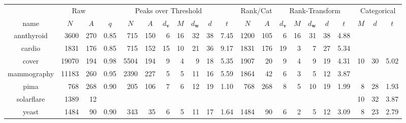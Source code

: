 \begin{tabular}{c|rr|rrrrrrrr|rr|rrrrr|rrr}
  \toprule



   
\multicolumn{1}{c}{~} & \multicolumn{2}{c}{Raw} & \multicolumn{8}{c}{Peaks over Threshold} & \multicolumn{2}{c}{Rank/Cat} & \multicolumn{5}{c}{Rank-Transform} & \multicolumn{3}{c}{Categorical} \\
\multicolumn{1}{c}{name} & \multicolumn{1}{c}{$N$} & \multicolumn{1}{c}{$A$} & \multicolumn{1}{c}{$q$} & \multicolumn{1}{c}{$N$} & \multicolumn{1}{c}{$A$} & \multicolumn{1}{c}{$d_{\bm{v}}$} & \multicolumn{1}{c}{$M$} & \multicolumn{1}{c}{$d_{\bm{w}}$} & \multicolumn{1}{c}{$d$} & \multicolumn{1}{c}{$t$} & \multicolumn{1}{c}{$N$} & \multicolumn{1}{c}{$A$} & \multicolumn{1}{c}{$d_{\bm{v}}$} & \multicolumn{1}{c}{$M$} & \multicolumn{1}{c}{$d_{\bm{w}}$} & \multicolumn{1}{c}{$d$} & \multicolumn{1}{c}{$t$}  & \multicolumn{1}{c}{$M$} & \multicolumn{1}{c}{$d$} & \multicolumn{1}{c}{$t$} \\ \hline

annthyroid  & 3600  & 270 & 0.85 & 715  & 150 &   6 &  16 &  32 &  38 & 7.45 & 1200 & 105 &   6 &  16 &  31 &  38 & 4.88 &     &     &      \\ 
cardio      & 1831  & 176 & 0.85 & 715  & 152 &  15 &  10 &  21 &  36 & 9.17 & 1831 & 176 &  19 &   3 &   7 &  27 & 5.34 &     &     &      \\ 
cover       & 19070 & 194 & 0.98 & 5504 & 194 &   9 &   4 &   9 &  18 & 5.35 & 1907 &  20 &   9 &   4 &   9 &  19 & 4.31 &  10 &  30 & 5.02 \\ 
mammography & 11183 & 260 & 0.95 & 2390 & 227 &   5 &   5 &  11 &  16 & 5.59 & 1864 &  42 &   6 &   3 &   5 &  12 & 3.87 &     &     &      \\ 
pima        & 768   & 268 & 0.90 & 205  & 106 &   7 &   6 &  12 &  19 & 1.10 & 768 & 268  &   8 &   5 &  10 &  19 & 1.99 &   8 &  28 & 1.93 \\ 
solarflare  & 1389  & 12  &      &      &     &     &     &     &     &      &     &      &     &     &     &     &      &  10 &  32 & 3.87 \\ 
yeast       & 1484  & 90  & 0.90 & 343  &  35 &   6 &   5 &  11 &  17 & 1.64 & 1484 &  90 &   6 &   2 &   5 &  12 & 3.09 &   8 &  23 & 2.79 \\ 
   \bottomrule
\end{tabular}
